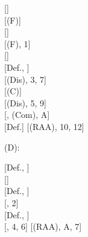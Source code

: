 \documentclass[a4paper,english,fleqn,11pt,final]{scrartcl}
\newcommand{\negg}{{\sim}}
\newcommand{\limp}{\multimap}
\newcommand{\timp}{\rightarrowtriangle}
\newcommand{\tens}{\otimes}
\newcommand{\Deriv}[1]{{\normalfont\textsf{#1}}}
\newcommand{\oland}{\owedge}
\theoremstyle{plain}
\theoremstyle{definition}
\begin{document}
{\begin{minipage}[t][][b]{.46\textwidth}
\medskip

{
\setlength{\fitchprfwidth}{1.63in}
\fitchprf{
\pline[A ]{\alpha \oland (\varphi \tens \psi)}
}
{
	\pline[1 ]{\alpha}[]\\
	\pline[2 ]{(\alpha \oland \varphi) \limp \alpha}[\Deriv{(F)}]\\
	\pline[3 ]{(\alpha \oland \varphi) \limp (\negg(\alpha \oland \psi) \timp \negg \psi) }[]\\
	\pline[4 ]{\psi \limp \alpha}[\Deriv{(F)}, 1]\\
	\pline[5 ]{\psi \limp(\negg(\alpha \oland \varphi) \timp \negg \varphi) }[]\\
	\subproof{\pline[6 ]{\negg ((\alpha \oland \varphi) \tens (\alpha \oland \psi))}}
	{
		\pline[7 ]{(\alpha \oland \varphi) \limp \negg(\alpha \oland \psi)}[Def., ]\\
		\pline[8 ]{(\alpha \oland \varphi) \limp \negg \psi}[\Deriv{(Dis)}, 3, 7]\\
		\pline[9 ]{\psi \limp \negg(\alpha \oland \varphi)}[\Deriv{(C)}]\\
		\pline[10]{\psi \limp \negg \varphi}[\Deriv{(Dis)}, 5, 9]\\
		\pline[11]{\psi \tens \varphi}[, \Deriv{(Com)}, A]\\
		\pline[12]{\negg(\psi \limp \negg\varphi)}[Def.]
	}
	\pline[\slider]{(\alpha \oland \varphi) \tens (\alpha \oland \psi)}[\Deriv{(RAA)}, 10, 12]
}
}
\end{minipage}


\bigskip


\begin{minipage}[t][][b]{.43\textwidth}

\Deriv{(D)}:

\medskip

{
\setlength{\fitchprfwidth}{1.15in}
\fitchprf{
\pline[A ]{(\varphi \tens \psi) \ovee (\varphi \tens \vartheta)}
}
{
\subproof{\pline[1 ]{\negg (\varphi \tens (\psi \ovee \vartheta))}}
{
	\pline[2 ]{\varphi \limp \negg(\psi \ovee \vartheta)}[Def., ]\\
	\pline[3 ]{\varphi \limp \negg \psi}[]\\
	\pline[4 ]{\negg(\varphi \tens \psi)}[Def., ]\\
	\pline[5 ]{\varphi \limp \negg \vartheta}[, 2]\\
	\pline[6 ]{\negg(\varphi \tens \vartheta)}[Def., ]\\
	\pline[7 ]{\hspace{-6pt}\brokenform{\negg((\varphi \tens \psi)}
	{\formula{\ovee(\varphi \tens \vartheta))}} \hspace{-10pt} }[, 4, 6]
}
	\pline[\slider]{\varphi \tens (\psi \ovee \vartheta)}[\Deriv{(RAA)}, A, 7]
}
}
\end{minipage}
\begin{minipage}[t][][b]{.46\textwidth}


\end{minipage}}
\end{document}
